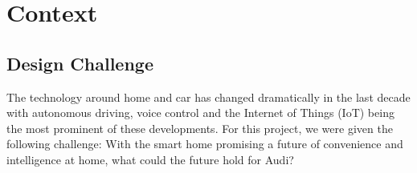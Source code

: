 \chapter{Context}\label{sec-context} %



\section{Design Challenge}
\label{sec:challenge}

The technology around home and car has changed dramatically in the last decade with autonomous driving, voice control and the Internet of Things (IoT) being the most prominent of these developments. For this project, we were given the following challenge: With the smart home promising a future of convenience and intelligence at home, what could the future hold for Audi?


